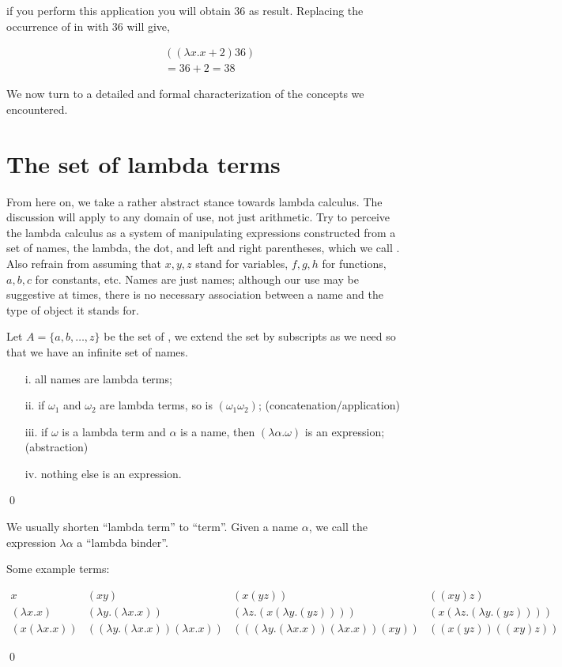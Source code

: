 \documentclass[11pt]{article}
\begin{document}
if you perform this application you will obtain 36 as result. Replacing the occurrence of  in  with 36 will give,

\begin{align}
& ((\lambda x. x+2)36)\\
& = 36+2 = 38 \nonumber
\end{align}


We now turn to a detailed and formal characterization of the concepts we encountered.


\section{The set of lambda terms}

From here on, we take a rather abstract stance towards lambda calculus.  The discussion will apply to any domain of use, not just arithmetic. Try to perceive the lambda calculus as a system of manipulating expressions constructed from a set of names, the lambda, the dot, and left and right parentheses, which we call . Also refrain from assuming that $x, y, z$ stand for variables, $f, g, h$ for functions, $a, b, c$  for constants, etc. Names are just names; although our use may be suggestive at times, there is no necessary association between a name and the type of object it stands for.

\begin{udefinition}\label{dfexp}
Let $A=\{ a,b,\ldots,z\}$ be the set of , we extend the set by subscripts as we need so that we have an infinite set of names.

\begin{itemize}
\item[i.] all names are lambda terms; 
\item[ii.] if $\omega_1$ and $\omega_2$ are lambda terms, so is $(\omega_1\omega_2)$; \hfill (concatenation/application)
\item[iii.] if $\omega$ is a lambda term and $\alpha$ is a name, then
$(\lambda\alpha.\omega)$ is an expression; \hfill (abstraction) 
\item[iv.] nothing else is an expression.
\end{itemize}
\qed
\end{udefinition} 

We usually shorten ``lambda term'' to ``term''. Given a name $\alpha$, we call the expression $\lambda\alpha$ a ``lambda binder''.


\begin{uexample}\label{fullex}
Some example terms:
\renewcommand{\arraycolsep}{6pt}
\renewcommand{\arraystretch}{2}

$$
\begin{array}{cccc}
x & (xy) & (x(yz))  & ((xy)z) \\
(\lambda x.x) & (\lambda y.(\lambda x.x)) & (\lambda z.(x(\lambda y.(yz)))) & (x(\lambda z.(\lambda y.(yz))))\\
(x(\lambda x.x)) & ((\lambda y.(\lambda x.x))(\lambda x.x)) & (((\lambda y.(\lambda x.x))(\lambda x.x))(xy)) & ((x(yz))((xy)z))
\end{array}
$$

\qed
\end{uexample}
\end{document}

